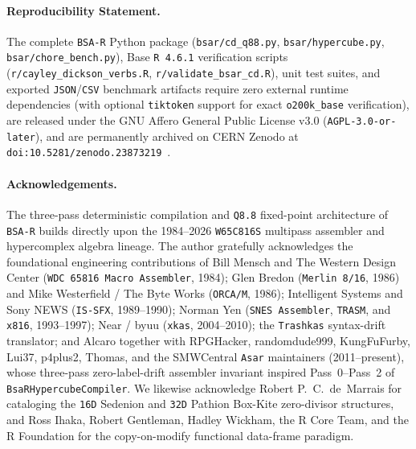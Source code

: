 \documentclass[11pt]{article}
\theoremstyle{plain}
\theoremstyle{definition}
\begin{document}
\paragraph{Reproducibility Statement.} The complete \texttt{BSA-R} Python package (\texttt{bsar/cd\_q88.py}, \texttt{bsar/hypercube.py}, \texttt{bsar/chore\_bench.py}), Base \texttt{R 4.6.1} verification scripts (\texttt{r/cayley\_dickson\_verbs.R}, \texttt{r/validate\_bsar\_cd.R}), unit test suites, and exported \texttt{JSON}/\texttt{CSV} benchmark artifacts require zero external runtime dependencies (with optional \texttt{tiktoken} support for exact \texttt{o200k\_base} verification), are released under the GNU Affero General Public License v3.0 (\texttt{AGPL-3.0-or-later}), and are permanently archived on CERN Zenodo at \texttt{doi:10.5281/zenodo.23873219}~\cite{duguay2026zenodo}.

\paragraph{Acknowledgements.} The three-pass deterministic compilation and \texttt{Q8.8} fixed-point architecture of \texttt{BSA-R} builds directly upon the 1984--2026 \texttt{W65C816S} multipass assembler and hypercomplex algebra lineage. The author gratefully acknowledges the foundational engineering contributions of Bill Mensch and The Western Design Center (\texttt{WDC 65816 Macro Assembler}, 1984); Glen Bredon (\texttt{Merlin 8/16}, 1986) and Mike Westerfield / The Byte Works (\texttt{ORCA/M}, 1986); Intelligent Systems and Sony NEWS (\texttt{IS-SFX}, 1989--1990); Norman Yen (\texttt{SNES Assembler}, \texttt{TRASM}, and \texttt{x816}, 1993--1997); Near / byuu (\texttt{xkas}, 2004--2010); the \texttt{Trashkas} syntax-drift translator; and Alcaro together with RPGHacker, randomdude999, KungFuFurby, Lui37, p4plus2, Thomas, and the SMWCentral \texttt{Asar} maintainers (2011--present), whose three-pass zero-label-drift assembler invariant inspired Pass~0--Pass~2 of \texttt{BsaRHypercubeCompiler}. We likewise acknowledge Robert P.~C.\ de~Marrais for cataloging the \texttt{16D} Sedenion and \texttt{32D} Pathion Box-Kite zero-divisor structures, and Ross Ihaka, Robert Gentleman, Hadley Wickham, the R Core Team, and the R Foundation for the copy-on-modify functional data-frame paradigm.
\end{document}
